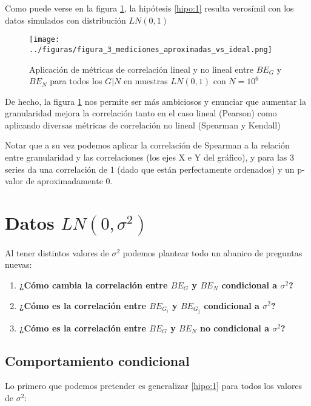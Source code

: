 Como puede verse en la figura \ref{fig:3}, la hipótesis \ref{hipo:1} resulta verosímil con los datos simulados con distribución $LN(0,1)$ 

\begin{figure}[H]
    \centering 
    \texttt{[image: ../figuras/figura\_3\_mediciones\_aproximadas\_vs\_ideal.png]} %
    \caption{Aplicación de métricas de correlación lineal y no lineal entre $BE_G$ y $BE_N$ para todos los $G | N$ en muestras $LN(0,1)$ con $N=10^6$}
    \label{fig:3}
\end{figure}

De hecho, la figura \ref{fig:3} nos permite ser más ambiciosos y enunciar que aumentar la granularidad mejora la correlación tanto en el caso lineal (Pearson) como aplicando diversas métricas de correlación no lineal (Spearman y Kendall)

Notar que a su vez podemos aplicar la correlación de Spearman a la relación entre granularidad y las correlaciones (los ejes X e Y del gráfico), y para las 3 series da una correlación de 1 (dado que están perfectamente ordenados) y un p-valor de aproximadamente 0.

\section{Datos $LN(0,\sigma^2)$}

Al tener distintos valores de $\sigma^2$ podemos plantear todo un abanico de preguntas nuevas:

\begin{enumerate}
    \item \textbf{¿Cómo cambia la correlación entre $BE_G$ y $BE_N$ condicional a $\sigma^2$?}
    \item \textbf{¿Cómo es la correlación entre $BE_{G_i}$ y $BE_{G_j}$ condicional a $\sigma^2$?}
    \item \textbf{¿Cómo es la correlación entre $BE_G$ y $BE_N$ no condicional a $\sigma^2$?}
\end{enumerate}

\subsection{Comportamiento condicional}

Lo primero que podemos pretender es generalizar \ref{hipo:1} para todos los valores de $\sigma^2$:

